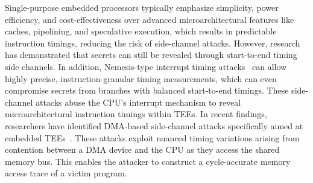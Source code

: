 Single-purpose embedded processors typically emphasize simplicity, power
efficiency, and cost-effectiveness over advanced microarchitectural
features like caches, pipelining, and speculative execution, which 
results in predictable instruction timings, reducing the risk of
side-channel attacks. However, research~\cite{Travis, brumley2005remote}
has demonstrated that secrets can still be revealed through start-to-end
timing side channels.
In addition, Nemesis-type interrupt timing attacks~\cite{Nemesis} can
allow highly precise, instruction-granular timing measurements, which
can even compromise secrets from branches with balanced start-to-end
timings. These side-channel attacks abuse the CPU's interrupt mechanism to
reveal microarchitectural instruction timings within \acp{TEE}.
In recent findings, researchers have identified DMA-based side-channel
attacks specifically aimed at embedded TEEs~\cite{busted, marton}. These
attacks exploit nuanced timing variations arising from contention between a
DMA device and the CPU as they access the shared memory bus. This
enables the attacker to construct a cycle-accurate memory
access trace of a victim program.

